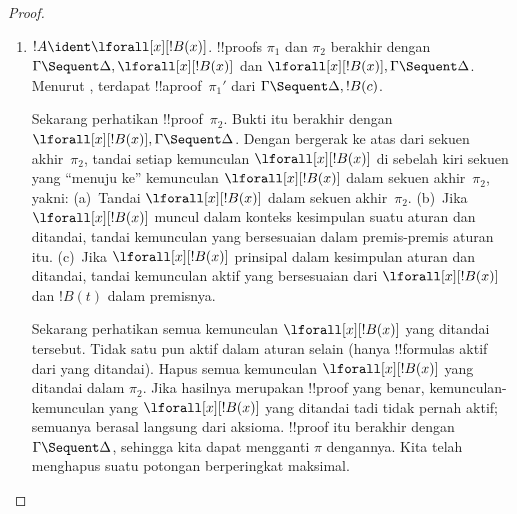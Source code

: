 \documentclass[../../../include/open-logic-section]{subfiles}
\begin{document}
\begin{proof}
\begin{enumerate}
   (keterbalikan untuk \LeftR{\lif} yang diterapkan
  pada~$\pi_2$), terdapat !!a{proof} $\pi_2'$ dari $\Gamma \Sequent
  \Delta, !B$ dan !!a{proof} $\pi_2''$ dari $!C, \Gamma \Sequent \Delta$.
  Dengan menerapkan  pada $\pi_2''$,
  kita juga memperoleh !!a{proof}~$\pi_2'''$ dari $!C, !B, \Gamma \Sequent
  \Delta$. !!{proof}~$\pi'$ ialah:
  \[
  \AxiomC{}
  \RightLabel{$\pi_2'$}
  \Deduce$\Gamma \fCenter \Delta, !B$
  \AxiomC{}
  \RightLabel{$\pi_1'$}
  \Deduce$!B, \Gamma \fCenter \Delta, !C$
  \AxiomC{}
  \RightLabel{$\pi_2'''$}
  \Deduce$!C, !B, \Gamma \fCenter \Delta$
  \RightLabel{\CutCS}
  \BinaryInf$!B, \Gamma \fCenter \Delta$
  \RightLabel{\CutCS}
  \BinaryInf$\Gamma \fCenter \Delta$
  \DisplayProof
  \]
  \item $!A \ident \lforall[x][!B(x)]$. !!{proof}s $\pi_1$ dan
  $\pi_2$ berakhir dengan $\Gamma \Sequent \Delta,
  \lforall[x][!B(x)]$ dan $\lforall[x][!B(x)], \Gamma \Sequent \Delta$.
  Menurut , terdapat !!a{proof}~$\pi_1'$ dari
  $\Gamma \Sequent \Delta, !B(c)$.

  Sekarang perhatikan !!{proof}~$\pi_2$. Bukti itu berakhir dengan
  $\lforall[x][!B(x)], \Gamma \Sequent \Delta$. Dengan bergerak ke atas
  dari sekuen akhir~$\pi_2$, tandai setiap kemunculan
  $\lforall[x][!B(x)]$ di sebelah kiri sekuen yang ``menuju ke'' kemunculan
  $\lforall[x][!B(x)]$ dalam sekuen akhir~$\pi_2$, yakni: (a)~Tandai
  $\lforall[x][!B(x)]$ dalam sekuen akhir~$\pi_2$. (b)~Jika
  $\lforall[x][!B(x)]$ muncul dalam konteks kesimpulan suatu aturan dan
  ditandai, tandai kemunculan yang bersesuaian dalam premis-premis aturan
  itu. (c)~Jika $\lforall[x][!B(x)]$ prinsipal dalam kesimpulan aturan
  \LeftR{\lforall} dan ditandai, tandai kemunculan aktif yang bersesuaian
  dari $\lforall[x][!B(x)]$ dan $!B(t)$ dalam premisnya.

  Sekarang perhatikan semua kemunculan $\lforall[x][!B(x)]$ yang ditandai
  tersebut. Tidak satu pun aktif dalam aturan selain \LeftR{\lforall}
  (hanya !!{formula}s aktif dari \LeftR{\lforall} yang ditandai). Hapus
  semua kemunculan $\lforall[x][!B(x)]$ yang ditandai dalam $\pi_2$. Jika
  hasilnya merupakan !!{proof} yang benar, kemunculan-kemunculan yang
  $\lforall[x][!B(x)]$ yang ditandai tadi tidak pernah aktif; semuanya
  berasal langsung dari aksioma.
  !!{proof} itu berakhir dengan~$\Gamma \Sequent \Delta$, sehingga kita
  dapat mengganti $\pi$ dengannya. Kita telah menghapus suatu potongan
  berperingkat maksimal.


\end{enumerate}
\end{proof}
\end{document}
